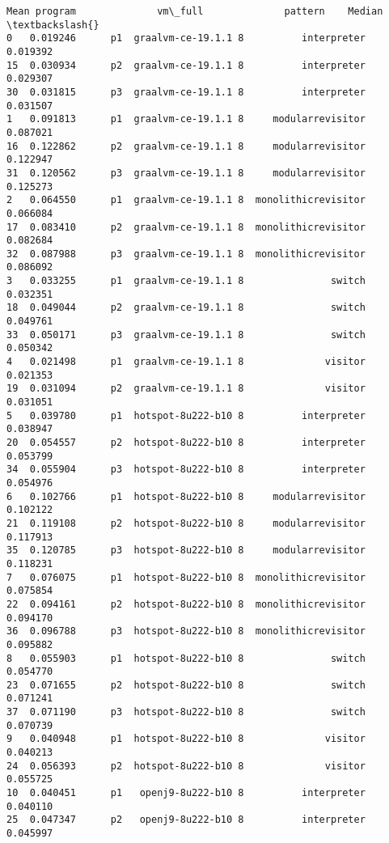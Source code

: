 \documentclass[11pt]{article}
\newcommand{\prompt}[4]{
        \llap{{\color{#2}[#3]: #4}}\vspace{-1.25em}
    }
\begin{document}
            \begin{tcolorbox}[breakable, boxrule=.5pt, size=fbox, pad at break*=1mm, opacityfill=0]
\prompt{Out}{outcolor}{5}{\hspace{3.5pt}}
\begin{Verbatim}[commandchars=\\\{\}]
        Mean program              vm\_full              pattern    Median  \textbackslash{}
0   0.019246      p1  graalvm-ce-19.1.1 8          interpreter  0.019392
15  0.030934      p2  graalvm-ce-19.1.1 8          interpreter  0.029307
30  0.031815      p3  graalvm-ce-19.1.1 8          interpreter  0.031507
1   0.091813      p1  graalvm-ce-19.1.1 8     modularrevisitor  0.087021
16  0.122862      p2  graalvm-ce-19.1.1 8     modularrevisitor  0.122947
31  0.120562      p3  graalvm-ce-19.1.1 8     modularrevisitor  0.125273
2   0.064550      p1  graalvm-ce-19.1.1 8  monolithicrevisitor  0.066084
17  0.083410      p2  graalvm-ce-19.1.1 8  monolithicrevisitor  0.082684
32  0.087988      p3  graalvm-ce-19.1.1 8  monolithicrevisitor  0.086092
3   0.033255      p1  graalvm-ce-19.1.1 8               switch  0.032351
18  0.049044      p2  graalvm-ce-19.1.1 8               switch  0.049761
33  0.050171      p3  graalvm-ce-19.1.1 8               switch  0.050342
4   0.021498      p1  graalvm-ce-19.1.1 8              visitor  0.021353
19  0.031094      p2  graalvm-ce-19.1.1 8              visitor  0.031051
5   0.039780      p1  hotspot-8u222-b10 8          interpreter  0.038947
20  0.054557      p2  hotspot-8u222-b10 8          interpreter  0.053799
34  0.055904      p3  hotspot-8u222-b10 8          interpreter  0.054976
6   0.102766      p1  hotspot-8u222-b10 8     modularrevisitor  0.102122
21  0.119108      p2  hotspot-8u222-b10 8     modularrevisitor  0.117913
35  0.120785      p3  hotspot-8u222-b10 8     modularrevisitor  0.118231
7   0.076075      p1  hotspot-8u222-b10 8  monolithicrevisitor  0.075854
22  0.094161      p2  hotspot-8u222-b10 8  monolithicrevisitor  0.094170
36  0.096788      p3  hotspot-8u222-b10 8  monolithicrevisitor  0.095882
8   0.055903      p1  hotspot-8u222-b10 8               switch  0.054770
23  0.071655      p2  hotspot-8u222-b10 8               switch  0.071241
37  0.071190      p3  hotspot-8u222-b10 8               switch  0.070739
9   0.040948      p1  hotspot-8u222-b10 8              visitor  0.040213
24  0.056393      p2  hotspot-8u222-b10 8              visitor  0.055725
10  0.040451      p1   openj9-8u222-b10 8          interpreter  0.040110
25  0.047347      p2   openj9-8u222-b10 8          interpreter  0.045997

\end{Verbatim}
\end{tcolorbox}
\end{document}
